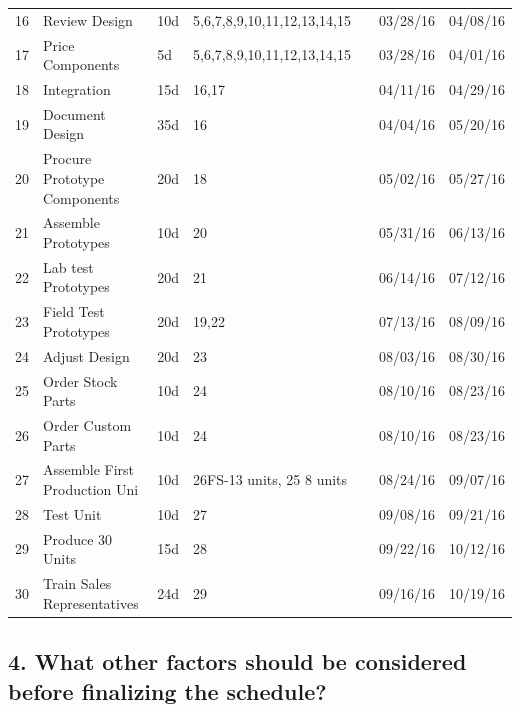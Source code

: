 \documentclass{article}
\begin{document}
\begin{table}[H]
\begin{tabular}{lllllll}
16       & Review Design                 & 10d      & 5,6,7,8,9,10,11,12,13,14,15 &  & 03/28/16     & 04/08/16   \\
17       & Price Components              & 5d       & 5,6,7,8,9,10,11,12,13,14,15 &  & 03/28/16     & 04/01/16   \\
18       & Integration                   & 15d      & 16,17                       &  & 04/11/16     & 04/29/16   \\
19       & Document Design               & 35d      & 16                          &  & 04/04/16     & 05/20/16   \\
20       & Procure Prototype Components  & 20d      & 18                          &  & 05/02/16     & 05/27/16   \\
21       & Assemble Prototypes           & 10d      & 20                          &  & 05/31/16     & 06/13/16   \\
22       & Lab test Prototypes           & 20d      & 21                          &  & 06/14/16     & 07/12/16   \\
23       & Field Test Prototypes         & 20d      & 19,22                       &  & 07/13/16     & 08/09/16   \\
24       & Adjust Design                 & 20d      & 23                          &  & 08/03/16     & 08/30/16   \\
25       & Order Stock Parts             & 10d      & 24                          &  & 08/10/16     & 08/23/16   \\
26       & Order Custom Parts            & 10d      & 24                          &  & 08/10/16     & 08/23/16   \\
27       & Assemble First Production Uni & 10d      & 26FS-13 units, 25 8 units   &  & 08/24/16     & 09/07/16   \\
28       & Test Unit                     & 10d      & 27                          &  & 09/08/16     & 09/21/16   \\
29       & Produce 30 Units              & 15d      & 28                          &  & 09/22/16     & 10/12/16   \\
30       & Train Sales Representatives   & 24d      & 29                          &  & 09/16/16     & 10/19/16  
\end{tabular}
\end{table}





\subsection{4. What other factors should be considered before finalizing the schedule? }
\end{document}
